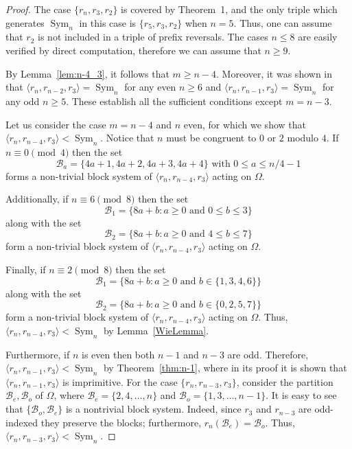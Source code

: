 \documentclass[
final
]{dmtcs-episciences}
\DeclareMathOperator{\Sym}{\mathrm{Sym}}
\begin{document}
\begin{proof} The case $\{r_n, r_3, r_2\}$ is covered by Theorem~1, and the only triple which generates $\Sym_n$ in this case is $\{r_5, r_3, r_2\}$ when $n=5$. Thus, one can assume that $r_2$ is not included in a triple of prefix reversals. The cases $n\leqslant 8$ are easily verified by direct computation, therefore we can assume that $n \geqslant 9$. 

By Lemma~\ref{lem:n-4_3}, it follows that $m\geqslant n-4$. 
Moreover, it was shown in~\cite{BS03} that $\langle r_n, r_{n-2}, r_3\rangle=\Sym_n$ for any even $n \geqslant 6$ and $\langle r_n,r_{n-1},r_3\rangle =\Sym_n$ for any odd $n\geqslant5$. These establish all the sufficient conditions except $m=n-3$. 

Let us consider the case $m=n-4$ and $n$ even, for which we show that $\langle r_n,r_{n-4},r_3\rangle<\Sym_n$. Notice that $n$ must be congruent to $0$ or $2$ modulo $4$. If $n\equiv 0\pmod 4$ then the set \[\mathcal{B}_a=\{4a+1,4a+2,4a+3,4a+4\}\text{ with }0\leqslant a\leqslant n/4-1\] forms a non-trivial block system of $\langle r_n,r_{n-4},r_3\rangle$ acting on $\Omega$. 

Additionally, if $n\equiv6\pmod 8$ then the set 
\[\mathcal{B}_1=\{8a+b:a\geqslant0\text { and }0\leqslant b\leqslant 3\}\] along with the set
\[\mathcal{B}_2=\{8a+b:a\geqslant0\text{ and } 4\leqslant b\leqslant 7\}\] form a non-trivial block system of $\langle r_n,r_{n-4},r_3\rangle$ acting on $\Omega$. 

Finally, if $n\equiv 2\pmod8$ then the set
\[\mathcal{B}_1=\{8a+b:a\geqslant0 \text{ and }b\in\{1,3,4,6\}\}\] along with the set
\[\mathcal{B}_2=\{8a+b:a\geqslant0\text{ and }b\in\{0,2,5,7\}\}\] form a non-trivial block system of $\langle r_n,r_{n-4},r_3\rangle$ acting on $\Omega$. Thus, $\langle r_n,r_{n-4},r_3\rangle<\Sym_n$ by Lemma~\ref{WieLemma}. 

\smallskip

Furthermore, if $n$ is even then both $n-1$ and $n-3$ are odd. Therefore, $\langle r_n,r_{n-1},r_3\rangle <\Sym_n$ by Theorem~\ref{thm:n-1}, where in its proof it is shown that $\langle r_n,r_{n-1},r_3\rangle$ is imprimitive. For the case $\{r_n,r_{n-3},r_3\} $, consider the  partition $\mathcal{B}_{e},\mathcal{B}_{o}$ of $\Omega$, where $\mathcal{B}_e=\{2,4,\ldots,n\}$ and $\mathcal{B}_o=\{1,3,\ldots,n-1\}$. It is easy to see that $\{\mathcal{B}_o,\mathcal{B}_e\}$ is a nontrivial block system. Indeed, since $r_3$ and $r_{n-3}$ are odd-indexed they preserve the blocks; furthermore, $r_n(\mathcal{B}_e)=\mathcal{B}_o$. Thus, $\langle r_n,r_{n-3},r_3\rangle<\Sym_n$. 


\end{proof}
\end{document}
